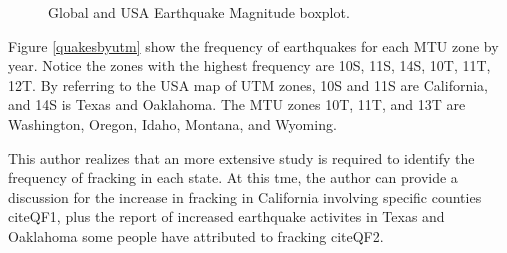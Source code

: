 \documentclass{article}
\begin{document}
\begin{figure}
\begin{center}
\caption{Global and USA Earthquake Magnitude boxplot.} \label{quakeboxplot}
\end{center}
\end{figure}

Figure \ref{quakesbyutm} show the frequency of earthquakes for each MTU zone by year.
Notice the zones with the highest frequency are 10S, 11S, 14S, 10T, 11T, 12T. By referring to the USA map of UTM zones, 10S and 11S are California, and 14S is Texas and Oaklahoma.
The MTU zones 10T, 11T, and 13T are Washington, Oregon, Idaho, Montana, and Wyoming.

This author realizes that an more extensive study is required to identify the frequency of fracking in each state. 
At this tme, the author can provide a discussion for the increase in fracking in California involving specific counties cite{QF1}, plus the report of increased earthquake activites in Texas and Oaklahoma some people have attributed to fracking cite{QF2}.
\end{document}
